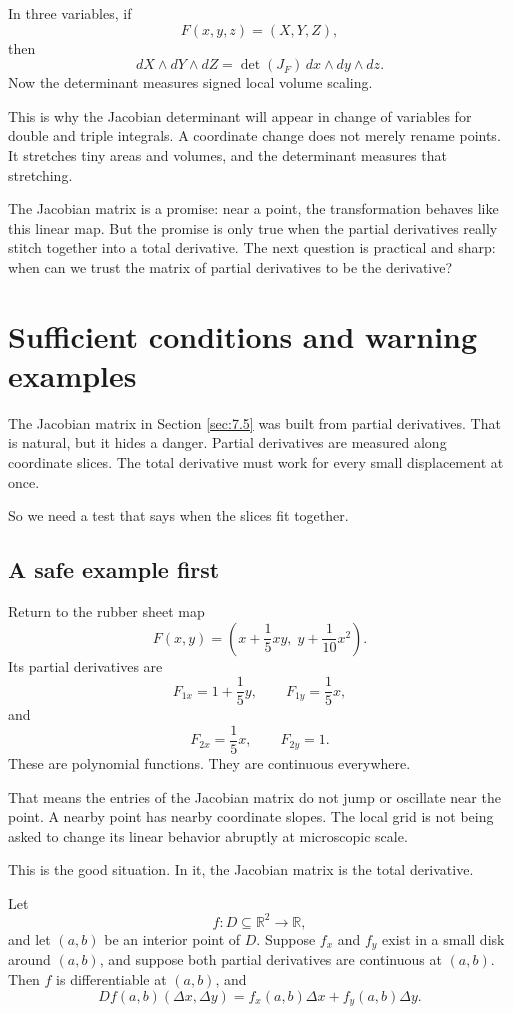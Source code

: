 In three variables, if
\[
    F(x,y,z)=(X,Y,Z),
\]
then
\[
\boxed{
    dX\wedge dY\wedge dZ
    =
    \det(J_F)\,dx\wedge dy\wedge dz.
}
\]
Now the determinant measures signed local volume scaling.

This is why the Jacobian determinant will appear in change of variables for double and
triple integrals.  A coordinate change does not merely rename points.  It stretches tiny
areas and volumes, and the determinant measures that stretching.

The Jacobian matrix is a promise: near a point, the transformation behaves like this
linear map.  But the promise is only true when the partial derivatives really stitch
together into a total derivative.  The next question is practical and sharp: when can we
trust the matrix of partial derivatives to be the derivative?

\section{Sufficient conditions and warning examples}
\label{sec:7.6}

The Jacobian matrix in Section \ref{sec:7.5} was built from partial derivatives.  That is
natural, but it hides a danger.  Partial derivatives are measured along coordinate slices.
The total derivative must work for every small displacement at once.

So we need a test that says when the slices fit together.

\subsection{A safe example first}

Return to the rubber sheet map
\[
    F(x,y)=
    \left(
        x+\frac15xy,\;
        y+\frac1{10}x^2
    \right).
\]
Its partial derivatives are
\[
    F_{1x}=1+\frac15y,
    \qquad
    F_{1y}=\frac15x,
\]
and
\[
    F_{2x}=\frac15x,
    \qquad
    F_{2y}=1.
\]
These are polynomial functions.  They are continuous everywhere.

That means the entries of the Jacobian matrix do not jump or oscillate near the point.
A nearby point has nearby coordinate slopes.  The local grid is not being asked to
change its linear behavior abruptly at microscopic scale.

This is the good situation.  In it, the Jacobian matrix is the total derivative.

\begin{theorem}
Let
\[
    f:D\subseteq\mathbb R^2\to\mathbb R,
\]
and let \((a,b)\) be an interior point of \(D\).  Suppose \(f_x\) and \(f_y\) exist in a
small disk around \((a,b)\), and suppose both partial derivatives are continuous at
\((a,b)\).  Then \(f\) is differentiable at \((a,b)\), and
\[
\boxed{
    Df(a,b)(\Delta x,\Delta y)
    =
    f_x(a,b)\Delta x+f_y(a,b)\Delta y.
}
\]
\end{theorem}

